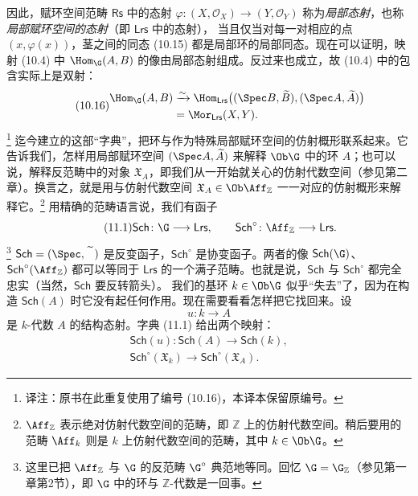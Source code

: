 因此，赋环空间范畴 $\mathsf{Rs}$ 中的态射 $\varphi\colon(X,\mathcal O_X)\to(Y,\mathcal O_Y)$ 称为\emph{局部态射}，也称\emph{局部赋环空间的态射}（即 $\mathsf{Lrs}$ 中的态射），
当且仅当对每一对相应的点 $(x,\varphi(x))$，茎之间的同态 (10.15) 都是局部环的局部同态。现在可以证明，映射 (10.4) 中 $\Hom_{\G}(A,B)$ 的像由局部态射组成。反过来也成立，故 (10.4) 中的包含实际上是双射：
\begin{equation}\tag{10.16}
\begin{split}
\Hom_{\G}(A,B)&\xrightarrow{\sim}
\Hom_{\mathsf{Lrs}}\bigl((\Spec B,\widetilde B),(\Spec A,\widetilde A)\bigr)\\
&=\Mor_{\mathsf{Lrs}}(X,Y).
\end{split}
\end{equation}
\footnote{译注：原书在此重复使用了编号 (10.16)，本译本保留原编号。}
迄今建立的这部“字典”，把环与作为特殊局部赋环空间的仿射概形联系起来。它告诉我们，怎样用局部赋环空间 $(\Spec A,\widetilde A)$ 来解释 $\Ob\G$ 中的环 $A$；也可以说，解释反范畴中的对象 $\mathfrak X_A$，即我们从一开始就关心的仿射代数空间（参见第二章）。换言之，就是用与仿射代数空间 $\mathfrak X_A\in\Ob\Aff_{\mathbb Z}$ 一一对应的仿射概形来解释它。\footnote{$\Aff_{\mathbb Z}$ 表示绝对仿射代数空间的范畴，即 $\mathbb Z$ 上的仿射代数空间。稍后要用的范畴 $\Aff_k$ 则是 $k$ 上仿射代数空间的范畴，其中 $k\in\Ob\G$。}
用精确的范畴语言说，我们有函子
\begin{equation}\tag{11.1}
\mathsf{Sch}\colon\G\longrightarrow\mathsf{Lrs},\qquad
\mathsf{Sch}^{\circ}\colon\Aff_{\mathbb Z}\longrightarrow\mathsf{Lrs}.
\end{equation}
\footnote{这里已把 $\Aff_{\mathbb Z}$ 与 $\G$ 的反范畴 $\G^{\circ}$ 典范地等同。回忆 $\G=\G_{\mathbb Z}$（参见第一章第2节），即 $\G$ 中的环与 $\mathbb Z$-代数是一回事。}
$\mathsf{Sch}=(\Spec,\widetilde{\phantom A})$ 是反变函子，$\mathsf{Sch}^{\circ}$ 是协变函子。两者的像 $\mathsf{Sch}(\G)$、$\mathsf{Sch}^{\circ}(\Aff_{\mathbb Z})$ 都可以等同于
$\mathsf{Lrs}$ 的一个满子范畴。也就是说，$\mathsf{Sch}$ 与 $\mathsf{Sch}^{\circ}$ 都完全忠实（当然，$\mathsf{Sch}$ 要反转箭头）。
我们的基环 $k\in\Ob\G$ 似乎“失去”了，因为在构造 $\mathsf{Sch}(A)$ 时它没有起任何作用。现在需要看看怎样把它找回来。设
\begin{equation}\tag{11.2}
 u\colon k\longrightarrow A
\end{equation}
是 $k$-代数 $A$ 的结构态射。字典 (11.1) 给出两个映射：
\begin{equation}\tag{11.3}
\begin{gathered}
\mathsf{Sch}(u)\colon\mathsf{Sch}(A)\longrightarrow\mathsf{Sch}(k),\\
\mathsf{Sch}^{\circ}(\mathfrak X_k)\longrightarrow
\mathsf{Sch}^{\circ}(\mathfrak X_A).
\end{gathered}
\end{equation}
